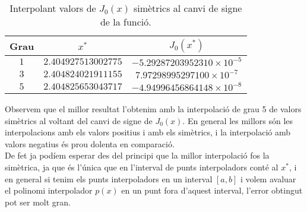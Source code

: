 \documentclass[12pt]{article}
\begin{document}
	\begin{table}[h!]
		\centering
		\caption{Interpolant valors de $J_0(x)$ simètrics al canvi de signe de la funció.}	
		\begin{tabular}{c|c|c}
			Grau & $x^*$ &$J_0(x^*)$\\
			\hline
			\hline
			$1$ & $2.404927513002775$  &$-5.29287203952310\times10^{-5}$\\
			$3$ & $2.404824021911155$ &$7.97298995297100\times10^{-7}$\\
			$5$ & $2.404825653043717$ &$-4.94996456864148\times10^{-8}
			$\\
		\end{tabular}
	\end{table}
	Observem que el millor resultat l'obtenim amb la interpolació de grau 5 de valors simètrics al voltant del canvi de signe de $J_0(x)$. En general les millors són les interpolacions amb els valors positius i amb els simètrics, i la interpolació amb valors negatius és prou dolenta en comparació.\\
	
	De fet ja podíem esperar des del principi que la millor interpolació fos la simètrica, ja que és l'única que en l'interval de punts interpoladors conté al $x^*$, i en general si tenim els punts interpoladors en un interval $[a,b]$ i volem avaluar el polinomi interpolador $p(x)$ en un punt fora d'aquest interval, l'error obtingut pot ser molt gran.
\end{document}
